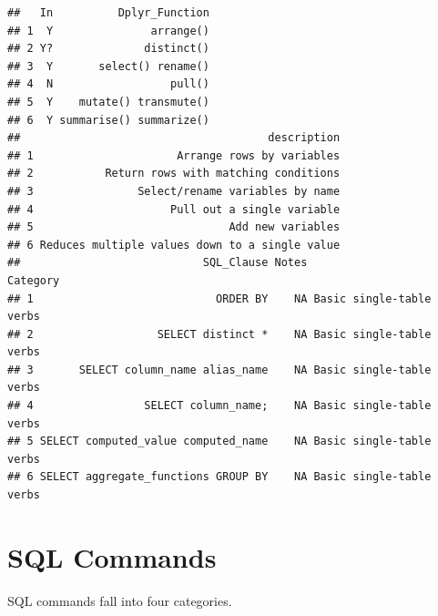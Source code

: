 \documentclass[]{book}
\theoremstyle{definition}
\theoremstyle{definition}
\theoremstyle{definition}
\theoremstyle{remark}
\begin{document}
\begin{verbatim}
##   In          Dplyr_Function
## 1  Y               arrange()
## 2 Y?              distinct()
## 3  Y       select() rename()
## 4  N                  pull()
## 5  Y    mutate() transmute()
## 6  Y summarise() summarize()
##                                      description
## 1                      Arrange rows by variables
## 2           Return rows with matching conditions
## 3                Select/rename variables by name
## 4                     Pull out a single variable
## 5                              Add new variables
## 6 Reduces multiple values down to a single value
##                            SQL_Clause Notes                 Category
## 1                            ORDER BY    NA Basic single-table verbs
## 2                   SELECT distinct *    NA Basic single-table verbs
## 3       SELECT column_name alias_name    NA Basic single-table verbs
## 4                 SELECT column_name;    NA Basic single-table verbs
## 5 SELECT computed_value computed_name    NA Basic single-table verbs
## 6 SELECT aggregate_functions GROUP BY    NA Basic single-table verbs
\end{verbatim}

\hypertarget{sql-commands}{%
\section{SQL Commands}\label{sql-commands}}

SQL commands fall into four categories.
\end{document}
